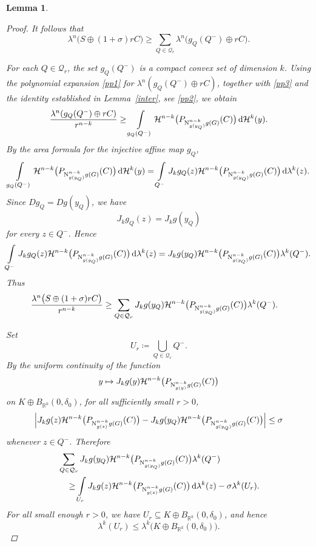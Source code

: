 \documentclass[pdflatex,sn-mathphys-num]{sn-jnl}
\theoremstyle{plain}
\newtheorem{lemma}[theorem]{Lemma}
\theoremstyle{definition}
\newcommand{\dH}[1]{\,\mathrm d\mathcal{H}^{#1}}
\newcommand{\dlambda}[1]{\,\mathrm d\lambda^{#1}}
\begin{document}
\begin{lemma}
\begin{proof}
It follows that
\[
\lambda^n\big(S\oplus(1+\sigma)rC\big)
\geq
\sum_{Q\in\mathcal Q_r}
\lambda^n\big(g_Q(Q^-)\oplus rC\big).
\]

For each \(Q\in\mathcal Q_r\), the set \(g_Q(Q^-)\) is a compact convex set
of dimension \(k\). Using the polynomial expansion \eqref{pp1} for \(\lambda^n(g_Q(Q^-)\oplus rC)\), together with \eqref{pp3} and
the identity established in Lemma~\ref{inter}, see \eqref{pp2}, we obtain
\[
\frac{\lambda^n(g_Q(Q^-)\oplus rC)}{r^{n-k}}
\geq
\int\limits_{g_Q(Q^-)}
\mathcal{H}^{n-k}
\big(P_{\textup{N}^{n-k}_{g(y_Q)}g(G)}(C)\big)\dH{k}(y).
\]
By the area formula for the injective affine map \(g_Q\),
\[
\int\limits_{g_Q(Q^-)}
\mathcal H^{n-k}
\big(P_{\textup{N}^{n-k}_{g(y_Q)}g(G)}(C)\big)\dH{k}(y)
=
\int\limits_{Q^-}
J_kg_Q(z)
\mathcal H^{n-k}
\big(P_{\textup{N}^{n-k}_{g(y_Q)}g(G)}(C)\big)\dlambda{k}(z).
\]
Since \(Dg_Q=Dg(y_Q)\), we have
\[
J_kg_Q(z)=J_kg(y_Q)
\]
for every \(z\in Q^-\). Hence
\[
\begin{split}
\int\limits_{Q^-}
J_kg_Q(z)
\mathcal H^{n-k}
\big(P_{\textup{N}^{n-k}_{g(y_Q)}g(G)}(C)\big)\dlambda{k}(z)
=
J_kg(y_Q)
\mathcal H^{n-k}
\big(P_{\textup{N}^{n-k}_{g(y_Q)}g(G)}(C)\big)\lambda^k(Q^-).
\end{split}
\]
Thus
\begin{equation}\label{pp7}
\begin{split}
\frac{\lambda^n\big(S\oplus(1+\sigma)rC\big)}{r^{n-k}}
&\geq
\sum_{Q\in\mathcal{Q}_r}
J_kg(y_Q)
\mathcal{H}^{n-k}
\big(P_{\textup{N}^{n-k}_{g(y_Q)}g(G)}(C)\big)\lambda^k(Q^-).
\end{split}
\end{equation}

Set
\[
U_r\coloneq\bigcup_{Q\in\mathcal Q_r}Q^-.
\]
By the uniform continuity of the function
\[
y\mapsto
J_kg(y)\mathcal H^{n-k}
\big(P_{\textup{N}^{n-k}_{g(y)}g(G)}(C)\big)
\]
on \(K\oplus B_{\mathbb R^k}(0, \delta_0)\), for all sufficiently small \(r>0\),
\begin{equation*}
\begin{split}
\Big|
J_kg(z)\mathcal{H}^{n-k}
\big(P_{\textup{N}^{n-k}_{g(z)}g(G)}(C)\big)-
J_kg(y_Q)\mathcal{H}^{n-k}
\big(P_{\textup{N}^{n-k}_{g(y_Q)}g(G)}(C)\big)
\Big|
\leq\sigma
\end{split}
\end{equation*}
whenever \(z\in Q^-\). Therefore
\begin{equation}\label{pp8}
\begin{split}
&\sum_{Q\in\mathcal Q_r}
J_kg(y_Q)\mathcal{H}^{n-k}
\big(P_{\textup{N}^{n-k}_{g(y_Q)}g(G)}(C)\big)
\lambda^k(Q^-)
\\
&\quad\geq
\int\limits_{U_r}
J_kg(z)\mathcal{H}^{n-k}
\big(P_{\textup{N}^{n-k}_{g(z)}g(G)}(C)\big)\dlambda{k}(z)
-\sigma\lambda^k(U_r).
\end{split}
\end{equation}
For all small enough $r>0$, we have \(U_r\subseteq K\oplus B_{\mathbb{R}^k}(0, \delta_0)\), and hence
\begin{equation}\label{pp10}
    \lambda^k(U_r)\leq\lambda^k\big(K\oplus B_{\mathbb{R}^k}(0, \delta_0)\big).
\end{equation}


\end{proof}
\end{lemma}
\end{document}
